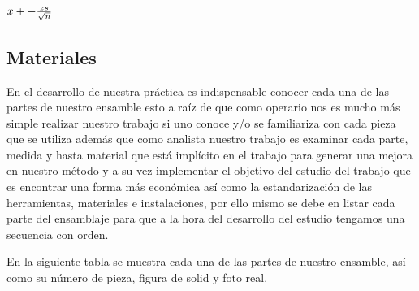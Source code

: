 \begin{center} 

${\-x}+-{\frac{zs}{\sqrt{n}}}$

\end{center}

\subsection{Materiales}

En el desarrollo de nuestra práctica es indispensable conocer cada una de las partes de nuestro ensamble esto a raíz de que como operario nos es mucho más simple realizar nuestro trabajo si uno conoce y/o se familiariza con cada pieza que se utiliza además que como analista nuestro trabajo es examinar cada parte, medida y hasta material que está implícito en el trabajo para generar una mejora en nuestro método y a su vez implementar el objetivo del estudio del trabajo que es encontrar una forma más económica así como la estandarización de las herramientas, materiales e instalaciones, por ello mismo se debe en listar cada parte del ensamblaje para que a la hora del desarrollo del estudio tengamos una secuencia con orden.

En la siguiente tabla se muestra cada una de las partes de nuestro ensamble, así como su número de pieza, figura de solid y foto real.


